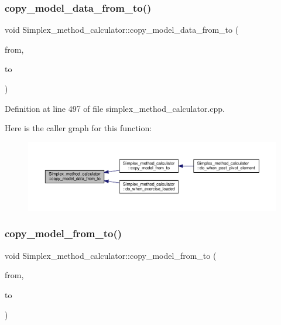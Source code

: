 \subsubsection{\texorpdfstring{copy\+\_\+model\+\_\+data\+\_\+from\+\_\+to()}{copy\_model\_data\_from\_to()}}
{\footnotesize\ttfamily void Simplex\+\_\+method\+\_\+calculator\+::copy\+\_\+model\+\_\+data\+\_\+from\+\_\+to (\begin{DoxyParamCaption}\item[{Q\+Standard\+Item\+Model $\ast$}]{from,  }\item[{Q\+Standard\+Item\+Model $\ast$}]{to }\end{DoxyParamCaption})\hspace{0.3cm}{\ttfamily [private]}}



Definition at line 497 of file simplex\+\_\+method\+\_\+calculator.\+cpp.

Here is the caller graph for this function\+:\nopagebreak
\begin{figure}[H]
\begin{center}
\leavevmode
\includegraphics[width=350pt]{classSimplex__method__calculator_a9423cd0eeed431e7f969b4ef1b222925_icgraph}
\end{center}
\end{figure}
\mbox{\label{classSimplex__method__calculator_a7a90111baf326f1146e85b009b6ef304}} 
\subsubsection{\texorpdfstring{copy\+\_\+model\+\_\+from\+\_\+to()}{copy\_model\_from\_to()}}
{\footnotesize\ttfamily void Simplex\+\_\+method\+\_\+calculator\+::copy\+\_\+model\+\_\+from\+\_\+to (\begin{DoxyParamCaption}\item[{Q\+Standard\+Item\+Model $\ast$}]{from,  }\item[{Q\+Standard\+Item\+Model $\ast$}]{to }\end{DoxyParamCaption})\hspace{0.3cm}{\ttfamily [private]}}



